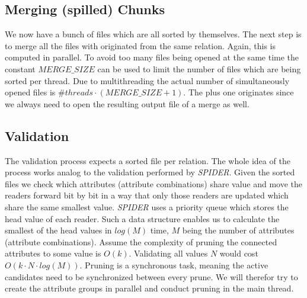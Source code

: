\subsection{Merging (spilled) Chunks}
We now have a bunch of files which are all sorted by themselves. The next step is to merge all the files with originated from the same relation. Again, this is computed in parallel. To avoid too many files being opened at the same time the constant $MERGE\_SIZE$ can be used to limit the number of files which are being sorted per thread. Due to multithreading the actual number of simultaneously opened files is $\#threads \cdot (MERGE\_SIZE + 1)$. The plus one originates since we always need to open the resulting output file of a merge as well.

\subsection{Validation}
The validation process expects a sorted file per relation. The whole idea of the process works analog to the validation performed by \textit{SPIDER}. Given the sorted files we check which attributes (attribute combinations) share value and move the readers forward bit by bit in a way that only those readers are updated which share the same smallest value. \textit{SPIDER} uses a priority queue which stores the head value of each reader. Such a data structure enables us to calculate the smallest of the head values in $log(M)$ time, $M$ being the number of attributes (attribute combinations). Assume the complexity of pruning the connected attributes to some value is $O(k)$. Validating all values $N$ would cost $O(k \cdot N \cdot log(M))$. Pruning is a synchronous task, meaning the active candidates need to be synchronized between every prune. We will therefor try to create the attribute groups in parallel and conduct pruning in the main thread.

